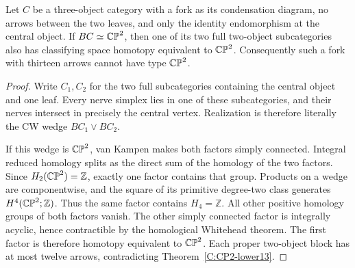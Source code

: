 \begin{lemma}\label{C:trivial-central-fork}
Let $C$ be a three-object category with a fork as its condensation
diagram, no arrows between the two leaves, and only the identity
endomorphism at the central object.  If $BC\simeq\mathbb {CP}^2$, then
one of its two full two-object subcategories also has classifying
space homotopy equivalent to $\mathbb {CP}^2$.  Consequently such a fork
with thirteen arrows cannot have type $\mathbb {CP}^2$.
\end{lemma}
\begin{proof}
Write $C_1,C_2$ for the two full subcategories containing the central
object and one leaf.  Every nerve simplex lies in one of these
subcategories, and their nerves intersect in precisely the central
vertex.  Realization is therefore literally the CW wedge
$BC_1\vee BC_2$.

If this wedge is $\mathbb {CP}^2$, van Kampen makes both factors simply
connected.  Integral reduced homology splits as the direct sum of
the homology of the two factors.  Since $H_2(\mathbb {CP}^2)=\mathbb Z$,
exactly one factor contains that group.  Products on a wedge are
componentwise, and the square of its primitive degree-two class
generates $H^4(\mathbb {CP}^2;\mathbb Z)$.  Thus the same factor contains
$H_4=\mathbb Z$.  All other positive homology groups of both
factors vanish.  The other simply connected factor is integrally
acyclic, hence contractible by the homological Whitehead theorem.
The first factor is therefore homotopy equivalent to $\mathbb {CP}^2$.
Each proper two-object block has at most twelve arrows, contradicting
Theorem~\ref{C:CP2-lower13}.
\end{proof}
